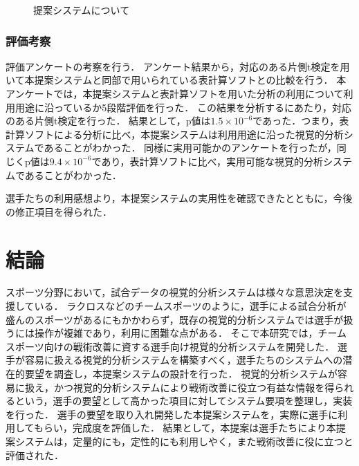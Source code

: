 \documentclass[sotsuron]{kuee}
\begin{document}
			\begin{figure}
				\begin{center}
				\end{center}
				\caption{提案システムについて}
		  		\label{fig:result08}
			\end{figure}
		\subsection{評価考察}
			評価アンケートの考察を行う．
			アンケート結果から，対応のある片側t検定を用いて本提案システムと同部で用いられている表計算ソフトとの比較を行う．
			本アンケートでは，本提案システムと表計算ソフトを用いた分析の利用について利用用途に沿っているか5段階評価を行った．
			この結果を分析するにあたり，対応のある片側t検定を行った．
			結果として，p値は$1.5 \times 10^{-6}$であった．つまり，表計算ソフトによる分析に比べ，本提案システムは利用用途に沿った視覚的分析システムであることがわかった．
			同様に実用可能かのアンケートを行ったが，同じくp値は$9.4 \times 10^{-6}$であり，表計算ソフトに比べ，実用可能な視覚的分析システムであることがわかった．

			選手たちの利用感想より，本提案システムの実用性を確認できたとともに，今後の修正項目を得られた．

\chapter{結論}
	スポーツ分野において，試合データの視覚的分析システムは様々な意思決定を支援している．
	ラクロスなどのチームスポーツのように，選手による試合分析が盛んのスポーツがあるにもかかわらず，既存の視覚的分析システムでは選手が扱うには操作が複雑であり，利用に困難な点がある．
	そこで本研究では，チームスポーツ向けの戦術改善に資する選手向け視覚的分析システムを開発した．
	選手が容易に扱える視覚的分析システムを構築すべく，選手たちのシステムへの潜在的要望を調査し，本提案システムの設計を行った．
	視覚的分析システムが容易に扱え，かつ視覚的分析システムにより戦術改善に役立つ有益な情報を得られるという，選手の要望として高かった項目に対してシステム要項を整理し，実装を行った．
	選手の要望を取り入れ開発した本提案システムを，実際に選手に利用してもらい，完成度を評価した．
	結果として，本提案は選手たちにより本提案システムは，定量的にも，定性的にも利用しやく，また戦術改善に役に立つと評価された．
\end{document}
